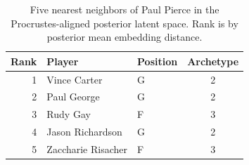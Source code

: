 \begin{table}[htbp]
  \centering\small
  \begin{tabular}{rllc}
    \toprule
    Rank & Player & Position & Archetype \\
    \midrule
    1 & Vince Carter & G & 2 \\
    2 & Paul George & G & 2 \\
    3 & Rudy Gay & F & 3 \\
    4 & Jason Richardson & G & 2 \\
    5 & Zaccharie Risacher & F & 3 \\
    \bottomrule
  \end{tabular}
  \caption{Five nearest neighbors of Paul Pierce in the Procrustes-aligned posterior latent space. Rank is by posterior mean embedding distance.}
  \label{tab:Paul_Pierce_neighbors}
\end{table}

